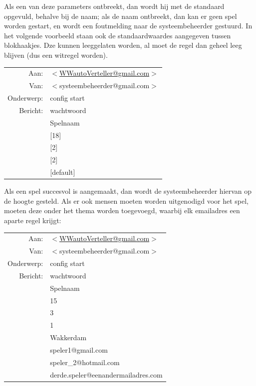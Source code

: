 \documentclass[12pt]{article}
\begin{document}
    Als een van deze parameters ontbreekt, dan wordt hij met de standaard opgevuld, behalve bij de naam; als de naam ontbreekt, dan kan er geen spel worden gestart, en wordt een foutmelding naar de systeembeheerder gestuurd. In het volgende voorbeeld staan ook de standaardwaardes aangegeven tussen blokhaakjes. Dze kunnen leeggelaten worden, al moet de regel dan geheel leeg blijven (dus een witregel worden).
    
    \begin{center}
      \begin{tabularx}{0.75\textwidth}[c]{|r X|}
	\hline
	Aan: & \href{mailto:<WWautoVerteller@gmail.com>}{$<$WWautoVerteller@gmail.com$>$} \\
	Van: & $<$systeembeheerder@gmail.com$>$ \\
	Onderwerp: & config start \\[\baselineskip]	
	Bericht: & wachtwoord \\
	 & Spelnaam \\
	 & [18] \\
	 & [2] \\
	 & [2] \\
	 & [default] \\
	\hline
      \end{tabularx}
    \end{center}
    
    Als een spel succesvol is aangemaakt, dan wordt de systeembeheerder hiervan op de hoogte gesteld. Als er ook mensen moeten worden uitgenodigd voor het spel, moeten deze onder het thema worden toegevoegd, waarbij elk emailadres een aparte regel krijgt:
    
    \begin{center}
      \begin{tabularx}{0.75\textwidth}[c]{|r X|}
	\hline
	Aan: & \href{mailto:<WWautoVerteller@gmail.com>}{$<$WWautoVerteller@gmail.com$>$} \\
	Van: & $<$systeembeheerder@gmail.com$>$ \\
	Onderwerp: & config start \\[\baselineskip]	
	Bericht: & wachtwoord \\
	 & Spelnaam \\
	 & 15 \\
	 & 3 \\
	 & 1 \\
	 & Wakkerdam \\
	 & speler1@gmail.com \\
	 & speler\_2@hotmail.com \\
	 & derde.speler@eenandermailadres.com \\
	\hline
      \end{tabularx}
    \end{center}
  
\end{document}
